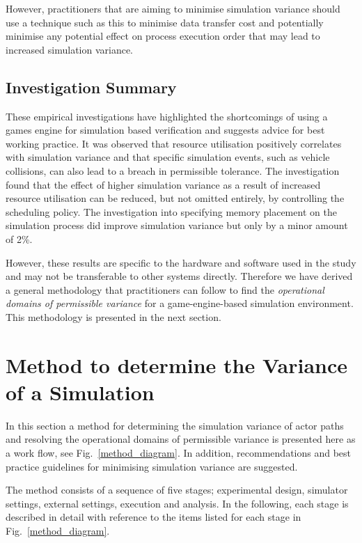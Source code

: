 However, practitioners that are aiming to minimise simulation variance should use a technique such as this to minimise data transfer cost and potentially minimise any potential effect on process execution order that may lead to increased simulation variance. 


\subsection{Investigation Summary} \label{s:empirical_summary} 
These empirical investigations have highlighted the shortcomings of using a games engine for simulation based verification and suggests advice for best working practice. It was observed that resource utilisation positively correlates with simulation variance and that specific simulation events, such as vehicle collisions, can also lead to a breach in permissible tolerance. The investigation found that the effect of higher simulation variance as a result of increased resource utilisation can be reduced, but not omitted entirely, by controlling the scheduling policy. The investigation into specifying memory placement on the simulation process did improve simulation variance but only by a minor amount of 2\%.

However, these results are specific to the hardware and software used in the study and may not be transferable to other systems directly. Therefore we have derived a general methodology that practitioners can follow to find the \textit{operational domains of permissible variance} for a game-engine-based simulation environment. This methodology is presented in the next section. 

\section{Method to determine the Variance of a Simulation} \label{s:methodology}
In this section a method for determining the simulation variance of actor paths and resolving the operational domains of permissible variance is presented here as a work flow, see Fig.~\ref{method_diagram}. In addition, recommendations and best practice guidelines for minimising simulation variance are suggested.

The method consists of a sequence of five stages; experimental design, simulator settings, external settings, execution and analysis. In the following, each stage is described in detail with reference to the items listed for each stage in Fig.~\ref{method_diagram}.

